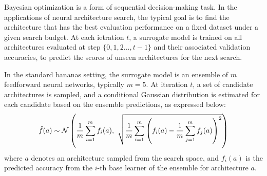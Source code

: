 {{\begin{algorithm}[htbp]
\begin{algorithmic}[1]
{\begin{enumerate}
{			\item Denote $a_{t}$ as the candidate architecture with maximum $\myfunc{\phi(a)}$; evaluate $\myfunc{f(a_{t})}$.
			\item $\mathcal{A}_{t} \leftarrow{\mathcal{A}_{t-1} \cup \{{a_{t}\}}$
		\end{enumerate}
    \ENDFOR 
    \STATE \textbf{Output:} $a^{*}=\operatorname*{argmin}_{t=1,...,T} f(a_{t})$    
  \end{algorithmic}
  \end{algorithm}

Bayesian optimization is a form of sequential decision-making task. In the applications of neural architecture search, the typical goal is to find the architecture that has the best evaluation performance on a fixed dataset under a given search budget. At each ietration $t$, a surrogate model is trained on all architectures evaluated at step $\{0, 1, 2..., t-1\}$ and their associated validation accuracies, to predict the scores of unseen architectures for the next search.

In the standard \gls{bananas} setting, the surrogate model is an ensemble of $m$ feedforward neural networks, typically $m=5$. At iteration $t$, a set of candidate architectures is sampled, and a conditional Gaussian distribution is estimated for each candidate based on the ensemble predictions, as expressed below:
\vspace{1em}
\begin{equation}
\hat{f}(a) \sim \mathcal{N} \left( 
\frac{1}{m} \sum_{i=1}^{m} f_i(a),\ 
\sqrt{\frac{1}{m} \sum_{i=1}^{m} \left(f_i(a) - \frac{1}{m} \sum_{j=1}^{m} f_j(a) \right)^2}
\right)
\label{eq:ensemble_gaussian}
\vspace{0.7em}
\end{equation}
\noindent
where $a$ denotes an architecture sampled from the search space, and $f_i(a)$ is the predicted accuracy from the $i$-th base learner of the ensemble for architecture $a$.

}}

